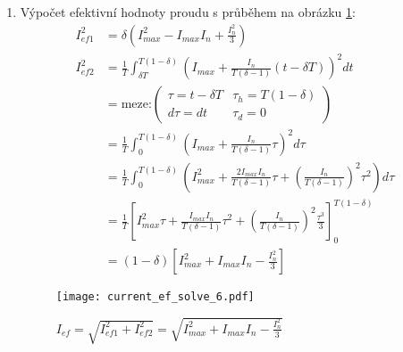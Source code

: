 \begin{enumerate}[noitemsep]
      \item Výpočet efektivní hodnoty proudu s průběhem na obrázku \ref{es:fig_current_ef_solve_6}:
        {\footnotesize
          \begin{align*}
            I_{ef1}^2 &=  \delta\left(I_{max}^2-I_{max}I_n+\frac{I_n^2}{3}\right)         \\
            I_{ef2}^2 &=  \frac{1}{T}\int_{\delta T}^{T(1-\delta)}\left(I_{max}
                         +\frac{I_n}{T(\delta-1)}(t-\delta T)\right)^2dt                  \\
                      &=  \text{meze:}\left(
                            \begin{array}{cc}
                                \tau = t -\delta T & \tau_h = T(1-\delta)  \\
                               d\tau = dt          & \tau_d = 0
                            \end{array}
                          \right) \\ \nonumber
                      &=  \frac{1}{T}\int_0^{T(1-\delta)}\left(I_{max} +
                          \frac{I_n}{T(\delta-1)}\tau\right)^2d\tau                       \\
                      &=  \frac{1}{T}\int_0^{T(1-\delta)}\left(I_{max}^2 +
                          \frac{2I_{max}I_n}{T(\delta-1)}\tau +
                          \left(\frac{I_n}{T(\delta-1)}\right)^2\tau^2\right)d\tau        \\
                      &=  \frac{1}{T}\left[I_{max}^2\tau +
                          \frac{I_{max}I_n}{T(\delta-1)}\tau^2 +
                          \left(\frac{I_n}{T(\delta-1)}\right)^2
                          \frac{\tau^3}{3}\right]_0^{T(1-\delta)}                         \\
                      &=  (1-\delta)\left[I_{max}^2+I_{max}I_n - \frac{I_n^2}{3}\right]
         \end{align*}
        } %
         \begin{figure}[ht!]
           \centering
           \texttt{[image: current\_ef\_solve\_6.pdf]}
           \caption{\(I_{ef} = \sqrt{I_{ef1}^2+I_{ef2}^2} = \sqrt{I_{max}^2+I_{max}I_{n} - 
                    \frac{I_n^2}{3}}\) }
           \label{es:fig_current_ef_solve_6}
         \end{figure}


\end{enumerate}
